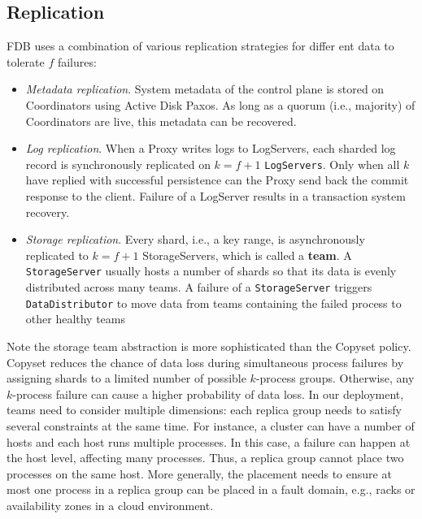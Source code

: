 \documentclass[11pt]{article}
\begin{document}
\subsection{Replication}
\label{sec:org6138ef9}
FDB uses a combination of various replication strategies for differ ent data to tolerate \(f\)
failures:
\begin{itemize}
\item \emph{Metadata replication}. System metadata of the control plane is stored on Coordinators using Active
Disk Paxos. As long as a quorum (i.e., majority) of Coordinators are live, this metadata can be
recovered.
\item \emph{Log replication}. When a Proxy writes logs to LogServers, each sharded log record is synchronously
replicated on \(k=f+1\) \texttt{LogServers}. Only when all \(k\) have replied with successful persistence can
the Proxy send back the commit response to the client. Failure of a LogServer results in a
transaction system recovery.
\item \emph{Storage replication}. Every shard, i.e., a key range, is asynchronously replicated to \(k=f+1\)
StorageServers, which is called a \textbf{team}. A \texttt{StorageServer} usually hosts a number of shards so that its
data is evenly distributed across many teams. A failure of a \texttt{StorageServer} triggers \texttt{DataDistributor}
to move data from teams containing the failed process to other healthy teams
\end{itemize}




Note the storage team abstraction is more sophisticated than the Copyset policy. Copyset reduces the
chance of data loss during simultaneous process failures by assigning shards to a limited number of
possible \(k\)-process groups. Otherwise, any \(k\)-process failure can cause a higher probability of
data loss. In our deployment, teams need to consider multiple dimensions: each replica group needs to
satisfy several constraints at the same time. For instance, a cluster can have a number of hosts and
each host runs multiple processes. In this case, a failure can happen at the host level, affecting
many processes. Thus, a replica group cannot place two processes on the same host. More generally, the
placement needs to ensure at most one process in a replica group can be placed in a fault domain,
e.g., racks or availability zones in a cloud environment.
\end{document}
